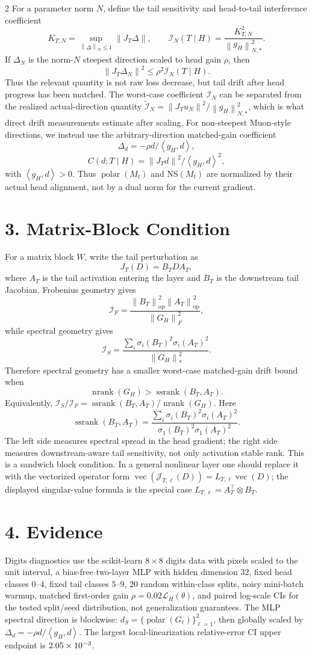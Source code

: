 \documentclass[10pt]{article}
\newcommand{\Loss}{\mathcal L}
\newcommand{\I}{\mathcal I}
\newcommand{\op}{\mathrm{op}}
\newcommand{\norm}[1]{\left\lVert #1 \right\rVert}
\newcommand{\inner}[2]{\left\langle #1,#2 \right\rangle}
\newcommand{\nrank}{\operatorname{nrank}}
\newcommand{\ssrank}{\operatorname{ssrank}}
\newcommand{\vecop}{\operatorname{vec}}
\newcommand{\polar}{\operatorname{polar}}
\begin{document}
\begin{multicols}{2}
For a parameter norm \(N\), define the tail sensitivity and head-to-tail interference coefficient
\[
K_{T,N}=\sup_{\norm{\Delta}_N\le 1}\norm{J_T\Delta},
\qquad
\I_N(T\mid H)=\frac{K_{T,N}^2}{\norm{g_H}_{N,*}^2}.
\]
If \(\Delta_N\) is the norm-\(N\) steepest direction scaled to head gain \(\rho\), then
\[
\norm{J_T\Delta_N}^2\le \rho^2\I_N(T\mid H).
\]
Thus the relevant quantity is not raw loss decrease, but tail drift after head progress has been matched.
The worst-case coefficient \(\I_N\) can be separated from the realized actual-direction quantity \(\widetilde{\I}_N=\norm{J_Tu_N}^2/\norm{g_H}_{N,*}^2\), which is what direct drift measurements estimate after scaling.
For non-steepest Muon-style directions, we instead use the arbitrary-direction matched-gain coefficient
\[
\Delta_d=-\rho d/\inner{g_H}{d},
\]
\[
C(d;T\mid H)=\norm{J_Td}^2/\inner{g_H}{d}^2,
\]
with \(\inner{g_H}{d}>0\). Thus \(\polar(M_t)\) and NS\((M_t)\) are normalized by their actual head alignment, not by a dual norm for the current gradient.

\section*{3. Matrix-Block Condition}
For a matrix block \(W\), write the tail perturbation as
\[
J_T(D)=B_TDA_T,
\]
where \(A_T\) is the tail activation entering the layer and \(B_T\) is the downstream tail Jacobian. Frobenius geometry gives
\[
\I_F=
\frac{\norm{B_T}_{\op}^2\norm{A_T}_{\op}^2}{\norm{G_H}_F^2},
\]
while spectral geometry gives
\[
\I_S=
\frac{\sum_i\sigma_i(B_T)^2\sigma_i(A_T)^2}{\norm{G_H}_*^2}.
\]
Therefore spectral geometry has a smaller worst-case matched-gain drift bound when
\[
\boxed{\nrank(G_H)>\ssrank(B_T,A_T).}
\]
Equivalently, \(\I_S/\I_F=\ssrank(B_T,A_T)/\nrank(G_H)\).
Here
\[
\ssrank(B_T,A_T)=
\frac{\sum_i\sigma_i(B_T)^2\sigma_i(A_T)^2}
{\sigma_1(B_T)^2\sigma_1(A_T)^2}.
\]
The left side measures spectral spread in the head gradient; the right side measures downstream-aware tail sensitivity, not only activation stable rank.
This is a sandwich block condition. In a general nonlinear layer one should replace it with the vectorized operator form \(\vecop(\mathcal{J}_{T,\ell}(D))=L_{T,\ell}\vecop(D)\); the displayed singular-value formula is the special case \(L_{T,\ell}=A_T^\top\otimes B_T\).

\section*{4. Evidence}
Digits diagnostics use the scikit-learn \(8\times 8\) digits data with pixels scaled to the unit interval, a bias-free two-layer MLP with hidden dimension 32, fixed head classes \(0\)--\(4\), fixed tail classes \(5\)--\(9\), 20 random within-class splits, noisy mini-batch warmup, matched first-order gain \(\rho=0.02\Loss_H(\theta)\), and paired log-scale CIs for the tested split/seed distribution, not generalization guarantees. The MLP spectral direction is blockwise: \(d_S=\{\polar(G_\ell)\}_{\ell=1}^2\), then globally scaled by \(\Delta_d=-\rho d/\inner{g_H}{d}\). The largest local-linearization relative-error CI upper endpoint is \(2.05\times 10^{-3}\).


\end{multicols}
\end{document}
